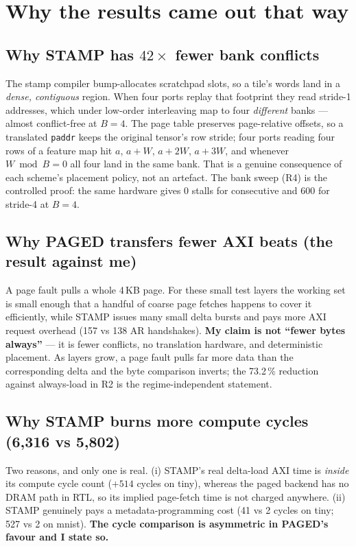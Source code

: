 \documentclass[11pt,a4paper]{article}
\newcommand{\file}[1]{\texttt{\small #1}}
\begin{document}
\section{Why the results came out that way}

\subsection{Why STAMP has $42\times$ fewer bank conflicts}

The stamp compiler bump-allocates scratchpad slots, so a tile's words land in a
\emph{dense, contiguous} region. When four ports replay that footprint they read
stride-1 addresses, which under low-order interleaving map to four
\emph{different} banks --- almost conflict-free at $B{=}4$. The page table
preserves page-relative offsets, so a translated \file{paddr} keeps the original
tensor's row stride; four ports reading four rows of a feature map hit
$a$, $a{+}W$, $a{+}2W$, $a{+}3W$, and whenever $W \bmod B = 0$ all four land in
the same bank. That is a genuine consequence of each scheme's placement policy,
not an artefact. The bank sweep (R4) is the controlled proof: the same hardware
gives 0 stalls for consecutive and 600 for stride-4 at $B{=}4$.

\subsection{Why PAGED transfers fewer AXI beats (the result against me)}

A page fault pulls a whole 4\,KB page. For these small test layers the working
set is small enough that a handful of coarse page fetches happens to cover it
efficiently, while STAMP issues many small delta bursts and pays more AXI
request overhead (157 vs 138 AR handshakes). \textbf{My claim is not ``fewer
bytes always''} --- it is fewer conflicts, no translation hardware, and
deterministic placement. As layers grow, a page fault pulls far more data than
the corresponding delta and the byte comparison inverts; the 73.2\,\% reduction
against always-load in R2 is the regime-independent statement.

\subsection{Why STAMP burns more compute cycles (6{,}316 vs 5{,}802)}

Two reasons, and only one is real. (i) STAMP's real delta-load AXI time is
\emph{inside} its compute cycle count ($+514$ cycles on tiny), whereas the paged
backend has no DRAM path in RTL, so its implied page-fetch time is not charged
anywhere. (ii) STAMP genuinely pays a metadata-programming cost (41 vs 2 cycles
on tiny; 527 vs 2 on mnist). \textbf{The cycle comparison is asymmetric in
PAGED's favour and I state so.}
\end{document}
